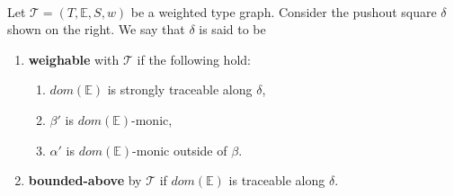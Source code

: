 \begin{definition}
    \label{def:weighable}
    \ \newline
    \noindent
    \begin{minipage}{0.7\textwidth}
        Let  $\mathcal{T} = (T,\mathbb{E}, S, w)$ be a weighted type graph.
        Consider the pushout square $\delta$ shown on the right. We say that $\delta$ is said to be
         \begin{enumerate}[label=(\alph*)]
        \item \textbf{weighable} with $\mathcal{T}$ if the following hold:
            \begin{enumerate}[label=(\roman*)]
                \item $dom(\mathbb{E})$ is strongly traceable along $\delta$,
                \item $\beta'$ is $dom(\mathbb{E})$-monic,
                \item $\alpha'$ is $dom(\mathbb{E})$-monic outside of $\beta$.
            \end{enumerate}
        \item \textbf{bounded-above} by $\mathcal{T}$ if $dom(\mathbb{E})$ is traceable along $\delta$.
    \end{enumerate}
    \end{minipage}
    \begin{minipage}{0.3\textwidth}
        \begin{center}
        \end{center}
    \end{minipage}
   
\end{definition}

